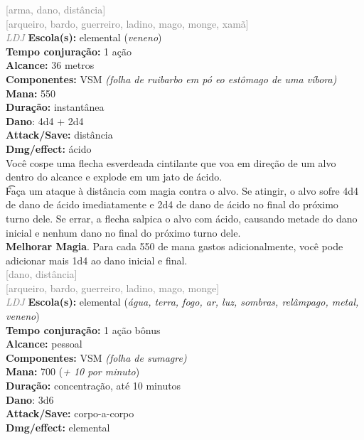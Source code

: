 \documentclass{RPG_Adventure}[2021/10/20]
\begin{document}
{\scriptsize \textcolor{gray}{[arma, dano, distância]\\}}
{\scriptsize \textcolor{gray}{[arqueiro, bardo, guerreiro, ladino, mago, monge, xamã]\\}}
{\tiny \textcolor{gray}{\textit{LDJ}}}\jump{}
{\small \t \textbf{Escola(s):} elemental (\textit{veneno})\\\t \textbf{Tempo conjuração:} 1 ação\\\t \textbf{Alcance:} 36 metros\\\t \textbf{Componentes:} VSM \textit{(folha de ruibarbo em pó eo estômago de uma víbora)}\\\t \textbf{Mana:} 550\\\t \textbf{Duração:} instantânea\\\t \textbf{Dano}: 4d4 + 2d4\\\t \textbf{Attack/Save:} distância\\\t \textbf{Dmg/effect:} ácido\\}
{\normalsize Você cospe uma flecha esverdeada cintilante que voa em direção de um alvo dentro do alcance e explode em um jato de ácido.\\\t Faça um ataque à distância com magia contra o alvo. Se atingir, o alvo sofre 4d4 de dano de ácido imediatamente e 2d4 de dano de ácido no final do próximo turno dele. Se errar, a flecha salpica o alvo com ácido, causando metade do dano inicial e nenhum dano no final do próximo turno dele.\\\t \textbf{Melhorar Magia}. Para cada 550 de mana gastos adicionalmente, você pode adicionar mais 1d4 ao dano inicial e final.\\}
{\scriptsize \textcolor{gray}{[dano, distância]\\}}
{\scriptsize \textcolor{gray}{[arqueiro, bardo, guerreiro, ladino, mago, monge]\\}}
{\tiny \textcolor{gray}{\textit{LDJ}}}\jump{}
{\small \t \textbf{Escola(s):} elemental (\textit{água, terra, fogo, ar, luz, sombras, relâmpago, metal, veneno})\\\t \textbf{Tempo conjuração:} 1 ação bônus\\\t \textbf{Alcance:} pessoal\\\t \textbf{Componentes:} VSM \textit{(folha de sumagre)}\\\t \textbf{Mana:} 700 (\textit{+ 10 por minuto})\\\t \textbf{Duração:} concentração, até 10 minutos\\\t \textbf{Dano}: 3d6\\\t \textbf{Attack/Save:} corpo-a-corpo\\\t \textbf{Dmg/effect:} elemental\\}
\end{document}
